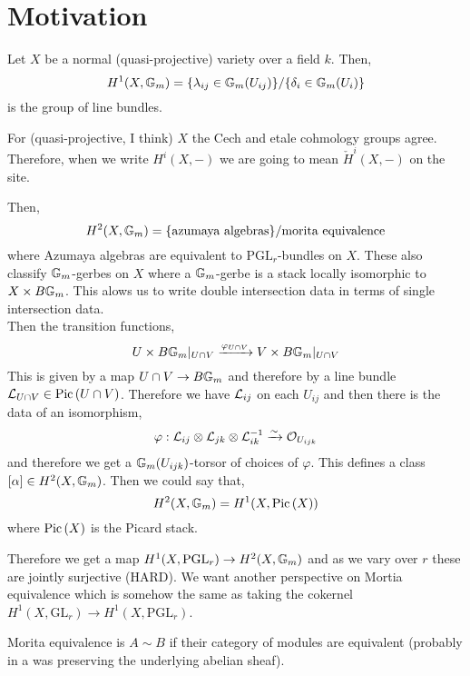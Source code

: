 \documentclass[12pt]{article}
\begin{document}
\section{Motivation}

\renewcommand{\GL}{\mathrm{GL}}
\renewcommand{\PGL}{\mathrm{PGL}}

Let $X$ be a normal (quasi-projective) variety over a field $k$. Then,
\[ H^1(X, \mathbb{G}_m) = \{ \lambda_{ij} \in \mathbb{G}_m(U_{ij}) \} / \{ \delta_i \in \mathbb{G}_m(U_i) \}  \]
is the group of line bundles. 

\begin{rmk}
For (quasi-projective, I think) $X$ the Cech and etale cohmology groups agree. Therefore, when we write $H^i(X,-)$ we are going to mean $\check{H}^i(X,-)$ on the \etale site. 
\end{rmk}

Then,
\[ H^2(X, \mathbb{G}_m) = \{ \text{azumaya algebras} \} / \text{morita equivalence} \]
where Azumaya algebras are equivalent to $\mathrm{PGL}_r$-bundles on $X$. These also classify $\mathbb{G}_m$-gerbes on $X$ where a $\mathbb{G}_m$-gerbe is a stack locally isomorphic to $X \times B \mathbb{G}_m$. This alows us to write double intersection data in terms of single intersection data. 
\bigskip\\
Then the transition functions,
\[ U \times B \mathbb{G}_m |_{U \cap V} \xrightarrow{\varphi_{U \cap V}} V \times B \mathbb{G}_m |_{U \cap V} \]
This is given by a map $U \cap V \to B \mathbb{G}_m$ and therefore by a line bundle $\mathcal{L}_{U \cap V} \in \mathrm{Pic} \left( U \cap V \right)$. 
Therefore we have $\mathcal{L}_{ij}$ on each $U_{ij}$ and then there is the data of an isomorphism,
\[ \varphi : \mathcal{L}_{ij} \otimes \mathcal{L}_{jk} \otimes \mathcal{L}_{ik}^{-1} \xrightarrow{\sim} \mathcal{O}_{U_{ijk}} \]
and therefore we get a $\mathbb{G}_m(U_{ijk})$-torsor of choices of $\varphi$. This defines a class $[\alpha] \in H^2(X, \mathbb{G}_m)$. Then we could say that,
\[ H^2(X, \mathbb{G}_m) = H^1(X, \mathrm{Pic} \left( X \right)) \]
where $\mathrm{Pic} \left( X \right)$ is the Picard stack. 

\begin{center}
\end{center}
Therefore we get a map $H^1(X, \PGL_r) \to H^2(X, \Gm)$ and as we vary over $r$ these are jointly surjective (HARD). We want another perspective on Mortia equivalence which is somehow the same as taking the cokernel $H^1(X, \GL_r) \to H^1(X, \PGL_r)$. 

\begin{defn}
Morita equivalence is $A \sim B$ if their category of modules are equivalent (probably in a was preserving the underlying abelian sheaf). 
\end{defn}
\end{document}
